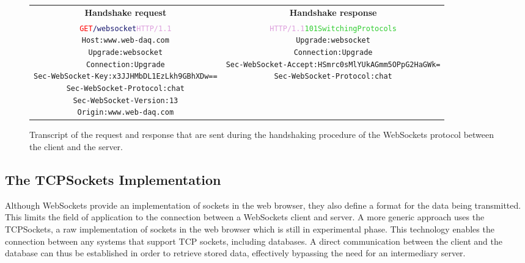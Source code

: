       \begin{figure}[t!]
        \begin{tabularx}{\textwidth}{C{1}C{1}}
          \textbf{Handshake  request} & \textbf{Handshake response} \\
        { \footnotesize
      \begin{alltt}
      \textcolor{Red}{GET} \textcolor{MidnightBlue}{/websocket} \textcolor{Plum}{HTTP/1.1} \newline
      \textcolor{BurntOrange}{Host:} www.web-daq.com \newline
      \textcolor{BurntOrange}{Upgrade:} websocket \newline
      \textcolor{BurntOrange}{Connection:} Upgrade \newline
      \textcolor{BurntOrange}{Sec-WebSocket-Key:} x3JJHMbDL1EzLkh9GBhXDw== \newline
      \textcolor{BurntOrange}{Sec-WebSocket-Protocol:} chat \newline
      \textcolor{BurntOrange}{Sec-WebSocket-Version:} 13 \newline
      \textcolor{BurntOrange}{Origin:} www.web-daq.com
      \end{alltt} } & { \footnotesize
      \begin{alltt}
      \textcolor{Plum}{HTTP/1.1} \textcolor{LimeGreen}{101 Switching Protocols} \newline
      \textcolor{BurntOrange}{Upgrade:} websocket \newline
      \textcolor{BurntOrange}{Connection:} Upgrade \newline
      \textcolor{BurntOrange}{Sec-WebSocket-Accept:} HSmrc0sMlYUkAGmm5OPpG2HaGWk= \newline
      \textcolor{BurntOrange}{Sec-WebSocket-Protocol:} chat
      \end{alltt} }
        \end{tabularx}
        \caption{Transcript of the request and response that are sent during the handshaking procedure of the WebSockets protocol between the client and the server.}
        \label{fig:III-2-websocket}
      \end{figure}

    \subsection{The TCPSockets Implementation}

      Although WebSockets provide an implementation of sockets in the web browser, they also define a format for the data being transmitted. This limits the field of application to the connection between a WebSockets client and server. A more generic approach uses the TCPSockets, a raw implementation of sockets in the web browser which is still in experimental phase. This technology enables the connection between any systems that support TCP sockets, including databases. A direct communication between the client and the database can thus be established in order to retrieve stored data, effectively bypassing the need for an intermediary server.

